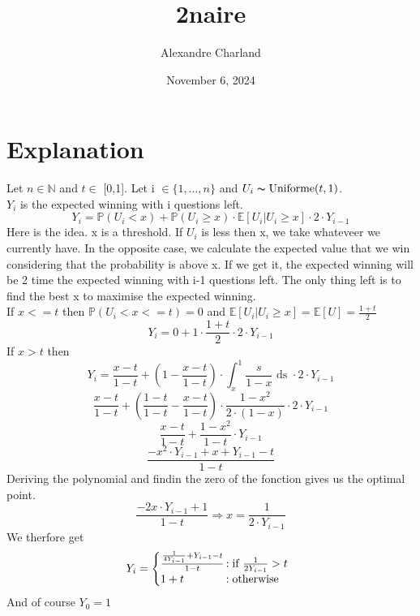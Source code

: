 \documentclass{article}
\title{2naire}
\author{Alexandre Charland}
\date{November 6, 2024}
\begin{document}
\maketitle

\section{Explanation}
Let $n \in \mathbb{N}$ and $t \in$ [0,1]. Let i $\in \{1,\ldots,n\}$ and $U_{i} \thicksim \text{Uniforme}(t,1)$.\\ 
$Y_{i}$ is the expected winning with i questions left.
\[ Y_{i} = \mathbb{P}(U_{i}<x)+\mathbb{P}(U_{i}\ge x)\cdot \mathbb{E}[U_{i}|U_{i}\ge x]\cdot 2\cdot Y_{i-1} \]
Here is the idea. x is a threshold. If $U_{i}$ is less then x, we take whateveer we currently have. In the opposite case, we calculate the expected value that we win considering that the probability is above x. If we get it, the expected winning will be 2 time the expected winning with i-1 questions left. The only thing left is to find the best x to maximise the expected winning.\\
If $x<=t$ then
$\mathbb{P}(U_{i}<x<=t) = 0$ and $\mathbb{E}[U_{i}|U_{i}\ge x] = \mathbb{E}[U] = \frac{1+t}{2}$
\[ Y_{i}=0+1\cdot \frac{1+t}{2}\cdot 2\cdot Y_{i-1} \]
If $x>t$ then
\[ Y_{i} = \frac{x-t}{1-t}+(1-\frac{x-t}{1-t})\cdot \int_{x}^{1} \frac{s}{1-x}\text{ ds }\cdot 2\cdot Y_{i-1} \]
\[ \frac{x-t}{1-t}+(\frac{1-t}{1-t}-\frac{x-t}{1-t})\cdot \frac{1-x^{2}}{2\cdot (1-x)} \cdot 2\cdot Y_{i-1} \]
\[ \frac{x-t}{1-t}+\frac{1-x^{2}}{1-t}\cdot Y_{i-1} \]
\[ \frac{-x^{2}\cdot Y_{i-1} + x + Y_{i-1} -t}{1-t} \]
Deriving the polynomial and findin the zero of the fonction gives us the optimal point.
\[ \frac{-2x\cdot Y_{i-1}+1}{1-t} \Rightarrow x=\frac{1}{2\cdot Y_{i-1}} \]
We therfore get
\[ Y_{i}=\left\{
     \begin{array}{@{}l@{\thinspace}l}
       \frac{\frac{1}{4Y_{i-1}}+Y_{i-1}-t}{1-t} &:\text{if } \frac{1}{2Y_{i-1}}>t\\
       1+t &: \text{otherwise}\\
     \end{array}
   \right. \]
And of course $Y_{0}=1$
\end{document}
